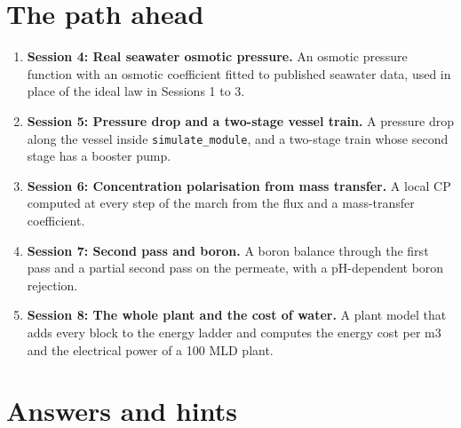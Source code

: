 \documentclass[11pt,a4paper]{article}
\begin{document}
\section{The path ahead}
\begin{enumerate}[nosep]
\item \textbf{Session 4: Real seawater osmotic pressure.} An osmotic pressure function with an osmotic coefficient fitted to published seawater data, used in place of the ideal law in Sessions 1 to 3.
\item \textbf{Session 5: Pressure drop and a two-stage vessel train.} A pressure drop along the vessel inside \texttt{simulate\_module}, and a two-stage train whose second stage has a booster pump.
\item \textbf{Session 6: Concentration polarisation from mass transfer.} A local CP computed at every step of the march from the flux and a mass-transfer coefficient.
\item \textbf{Session 7: Second pass and boron.} A boron balance through the first pass and a partial second pass on the permeate, with a pH-dependent boron rejection.
\item \textbf{Session 8: The whole plant and the cost of water.} A plant model that adds every block to the energy ladder and computes the energy cost per m3 and the electrical power of a 100 MLD plant.
\end{enumerate}

\section{Answers and hints}
\end{document}

